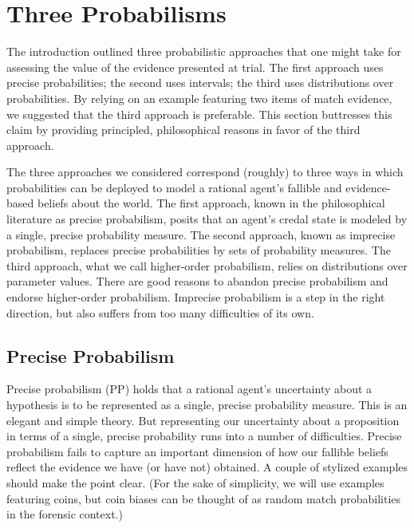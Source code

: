 \documentclass[
  10pt,
  dvipsnames,enabledeprecatedfontcommands]{scrartcl}
\begin{document}
\pagebreak

\hypertarget{three-probabilisms}{%
\section{Three Probabilisms}\label{three-probabilisms}}

The introduction outlined three probabilistic approaches that one might
take for assessing the value of the evidence presented at trial. The
first approach uses precise probabilities; the second uses intervals;
the third uses distributions over probabilities. By relying on an
example featuring two items of match evidence, we suggested that the
third approach is preferable. This section buttresses this claim by
providing principled, philosophical reasons in favor of the third
approach.

The three approaches we considered correspond (roughly) to three ways in
which probabilities can be deployed to model a rational agent's fallible
and evidence-based beliefs about the world. The first approach, known in
the philosophical literature as precise probabilism, posits that an
agent's credal state is modeled by a single, precise probability
measure. The second approach, known as imprecise probabilism, replaces
precise probabilities by sets of probability measures. The third
approach, what we call higher-order probabilism, relies on distributions
over parameter values. There are good reasons to abandon precise
probabilism and endorse higher-order probabilism. Imprecise probabilism
is a step in the right direction, but also suffers from too many
difficulties of its own.

\hypertarget{precise-probabilism}{%
\subsection{Precise Probabilism}\label{precise-probabilism}}

Precise probabilism (\textsf{PP}) holds that a rational agent's
uncertainty about a hypothesis is to be represented as a single, precise
probability measure. This is an elegant and simple theory. But
representing our uncertainty about a proposition in terms of a single,
precise probability runs into a number of difficulties. Precise
probabilism fails to capture an important dimension of how our fallible
beliefs reflect the evidence we have (or have not) obtained. A couple of
stylized examples should make the point clear. (For the sake of
simplicity, we will use examples featuring coins, but coin biases can be
thought of as random match probabilities in the forensic context.)
\end{document}
